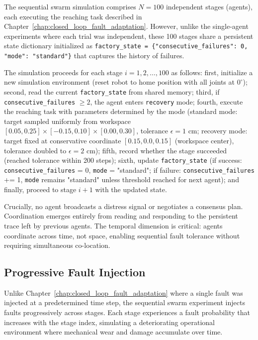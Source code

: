 \documentclass[12pt,a4paper,oneside]{report}
\begin{document}
The sequential swarm simulation comprises $N = 100$ independent stages (agents), each executing the reaching task described in Chapter~\ref{chap:closed_loop_fault_adaptation}. However, unlike the single-agent experiments where each trial was independent, these 100 stages share a persistent state dictionary initialized as \texttt{factory\_state = \{"consecutive\_failures": 0, "mode": "standard"\}} that captures the history of failures.

The simulation proceeds for each stage $i = 1, 2, \ldots, 100$ as follows: first, initialize a new simulation environment (reset robot to home position with all joints at $0^\circ$); second, read the current \texttt{factory\_state} from shared memory; third, if \texttt{consecutive\_failures} $\geq 2$, the agent enters \texttt{recovery} mode; fourth, execute the reaching task with parameters determined by the mode (standard mode: target sampled uniformly from workspace $[0.05, 0.25] \times [-0.15, 0.10] \times [0.00, 0.30]$, tolerance $\epsilon = 1$ cm; recovery mode: target fixed at conservative coordinate $[0.15, 0.0, 0.15]$ (workspace center), tolerance doubled to $\epsilon = 2$ cm); fifth, record whether the stage succeeded (reached tolerance within 200 steps); sixth, update \texttt{factory\_state} (if success: \texttt{consecutive\_failures} = 0, \texttt{mode} = "standard"; if failure: \texttt{consecutive\_failures} += 1, \texttt{mode} remains "standard" unless threshold reached for next agent); and finally, proceed to stage $i+1$ with the updated state.

Crucially, no agent broadcasts a distress signal or negotiates a consensus plan. Coordination emerges entirely from reading and responding to the persistent trace left by previous agents. The temporal dimension is critical: agents coordinate across time, not space, enabling sequential fault tolerance without requiring simultaneous co-location.

\subsection{Progressive Fault Injection}
\label{subsec:progressive_fault_injection}

Unlike Chapter~\ref{chap:closed_loop_fault_adaptation} where a single fault was injected at a predetermined time step, the sequential swarm experiment injects faults progressively across stages. Each stage experiences a fault probability that increases with the stage index, simulating a deteriorating operational environment where mechanical wear and damage accumulate over time.
\end{document}
